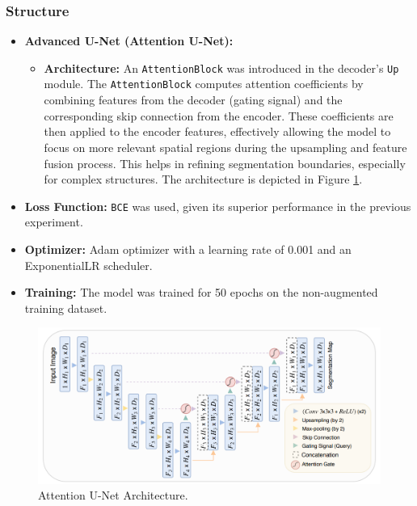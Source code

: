 \documentclass{article}
\begin{document}
\subsubsection{Structure}
\begin{itemize}
  \item \textbf{Advanced U-Net (Attention U-Net):}
        \begin{itemize}
          \item \textbf{Architecture:} An \texttt{AttentionBlock} was introduced in the decoder's \texttt{Up} module. The \texttt{AttentionBlock} computes attention coefficients by combining features from the decoder (gating signal) and the corresponding skip connection from the encoder. These coefficients are then applied to the encoder features, effectively allowing the model to focus on more relevant spatial regions during the upsampling and feature fusion process. This helps in refining segmentation boundaries, especially for complex structures. The architecture is depicted in Figure \ref{fig:attention_unet_architecture}.
        \end{itemize}
  \item \textbf{Loss Function:} \texttt{BCE} was used, given its superior performance in the previous experiment.
  \item \textbf{Optimizer:} Adam optimizer with a learning rate of 0.001 and an ExponentialLR scheduler.
  \item \textbf{Training:} The model was trained for 50 epochs on the non-augmented training dataset.
\end{itemize}

\begin{figure}[H]
  \centering
  \includegraphics[width=\linewidth]{../result/for_ppt/attention_unet.png}
  \caption{Attention U-Net Architecture.}
  \label{fig:attention_unet_architecture}
\end{figure}
\end{document}
